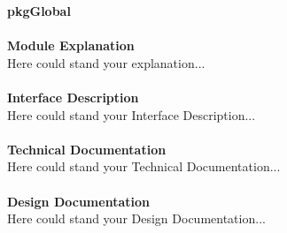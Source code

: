\documentclass[../../../../doc/ASP-SoC_doc/main.tex]{subfiles}
\begin{document}
\textbf{pkgGlobal}
\\\\
\textbf{Module Explanation}
\\
Here could stand your explanation...\\
\\
\textbf{Interface Description}
\\
Here could stand your Interface Description...\\
\\
\textbf{Technical Documentation}
\\
Here could stand your Technical Documentation...\\
\\
\textbf{Design Documentation}
\\
Here could stand your Design Documentation...\\
\\
\end{document}
